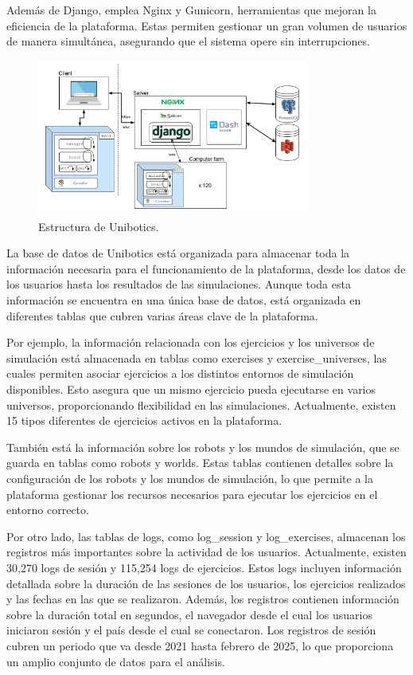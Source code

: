 \documentclass[a4paper, 12pt]{book}
\begin{document}
Además de Django, emplea Nginx y Gunicorn, herramientas que mejoran la eficiencia de la plataforma. Estas permiten gestionar un gran volumen de usuarios de manera simultánea, asegurando que el sistema opere sin interrupciones.

\begin{figure}
  \centering
  \includegraphics[width=0.8\textwidth, keepaspectratio]{img/arquitectura.png}
  \caption{Estructura de Unibotics.}\label{fig:arquitectura}
\end{figure}

La base de datos de Unibotics está organizada para almacenar toda la información necesaria para el funcionamiento de la plataforma, desde los datos de los usuarios hasta los resultados de las simulaciones. Aunque toda esta información se encuentra en una única base de datos, está organizada en diferentes tablas que cubren varias áreas clave de la plataforma.

Por ejemplo, la información relacionada con los ejercicios y los universos de simulación está almacenada en tablas como exercises y exercise\_universes, las cuales permiten asociar ejercicios a los distintos entornos de simulación disponibles. Esto asegura que un mismo ejercicio pueda ejecutarse en varios universos, proporcionando flexibilidad en las simulaciones. Actualmente, existen 15 tipos diferentes de ejercicios activos en la plataforma.

También está la información sobre los robots y los mundos de simulación, que se guarda en tablas como robots y worlds. Estas tablas contienen detalles sobre la configuración de los robots y los mundos de simulación, lo que permite a la plataforma gestionar los recursos necesarios para ejecutar los ejercicios en el entorno correcto.

Por otro lado, las tablas de logs, como log\_session y log\_exercises, almacenan los registros más importantes sobre la actividad de los usuarios. Actualmente, existen 30,270 logs de sesión y 115,254 logs de ejercicios. Estos logs incluyen información detallada sobre la duración de las sesiones de los usuarios, los ejercicios realizados y las fechas en las que se realizaron. Además, los registros contienen información sobre la duración total en segundos, el navegador desde el cual los usuarios iniciaron sesión y el país desde el cual se conectaron. Los registros de sesión cubren un periodo que va desde 2021 hasta febrero de 2025, lo que proporciona un amplio conjunto de datos para el análisis.
\end{document}
